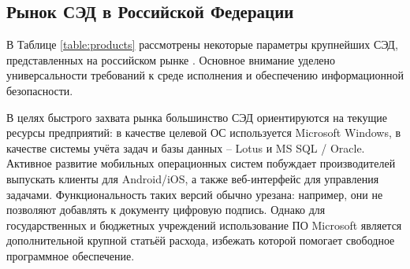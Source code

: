 \subsection{Рынок СЭД в Российской Федерации} \label{review_products}

В Таблице \ref{table:products} рассмотрены некоторые параметры крупнейших СЭД, представленных на российском рынке \cite{ixbt} \cite{evfrat}. Основное внимание уделено универсальности требований к среде исполнения и обеспечению информационной безопасности.

\vspace{\baselineskip}
В целях быстрого захвата рынка большинство СЭД ориентируются на текущие ресурсы предприятий: в качестве целевой ОС используется Microsoft Windows, в качестве системы учёта задач и базы данных – Lotus и MS SQL / Oracle. Активное развитие мобильных операционных систем побуждает производителей выпускать клиенты для Android/iOS, а также веб-интерфейс для управления задачами. Функциональность таких версий обычно урезана: например, они не позволяют добавлять к документу цифровую подпись. Однако для государственных и бюджетных учреждений использование ПО Microsoft является дополнительной крупной статьёй расхода, избежать которой помогает свободное программное обеспечение.

